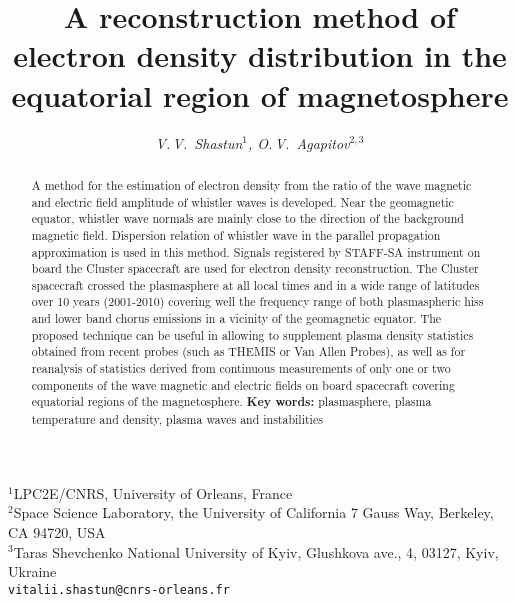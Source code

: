 \documentclass[a4paper]{article}
\begin{document}
\fontsize{11}{11}\selectfont %
\title{A reconstruction method of electron density distribution in the equatorial region of magnetosphere}
\author{\textsl{V.\,V.~Shastun$^{1}$, O.\,V.~Agapitov$^{2,3}$}}
\date{\vspace*{-6ex}}
\maketitle
\begin{center} {\small $^{1}$LPC2E/CNRS, University of Orleans, France\\
$^{2}$Space Science Laboratory, the University of California 7 Gauss Way, Berkeley, CA 94720, USA\\
$^{3}$Taras Shevchenko National University of Kyiv, Glushkova ave., 4, 03127, Kyiv, Ukraine\\
{\tt vitalii.shastun@cnrs-orleans.fr}}
\end{center}
	
\begin{abstract}
A method for the estimation of electron density from the ratio of the wave magnetic and electric field amplitude of whistler waves is developed. Near the geomagnetic equator, whistler wave normals are mainly close to the direction of the background magnetic field. Dispersion relation  of whistler wave in the parallel propagation approximation is used in this method. Signals registered by STAFF-SA instrument on board the Cluster spacecraft are used for electron density reconstruction. The Cluster spacecraft crossed the plasmasphere at all local times and in a wide range of latitudes over 10 years (2001-2010) covering well the frequency range of both plasmaspheric hiss and lower band chorus emissions in a vicinity of the geomagnetic equator. The proposed technique can be useful in allowing to supplement plasma density statistics obtained from recent probes (such as THEMIS or Van Allen Probes), as well as for reanalysis of  statistics derived from continuous measurements of only one or two components of the wave magnetic and electric fields on board spacecraft covering equatorial regions of the magnetosphere.
{\bf Key words:} plasmasphere, plasma temperature and density, plasma waves and instabilities
\end{abstract}
\end{document}
